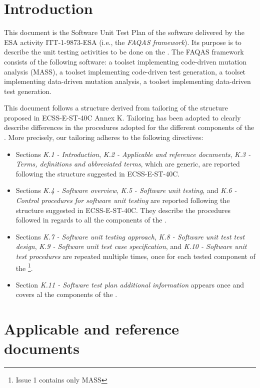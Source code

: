 
\chapter{Introduction}

This document is the Software Unit Test Plan of the software delivered by the ESA activity ITT-1-9873-ESA (i.e., the \emph{FAQAS framework}). Its purpose is to describe the unit testing activities to be done on the \FAQAS.
The FAQAS framework consists of the following software: a toolset  implementing code-driven mutation analysis (MASS), a toolset implementing code-driven test generation, a toolset implementing data-driven mutation analysis, a toolset implementing data-driven test generation.

This document follows a structure derived from tailoring of the structure proposed in ECSS-E-ST-40C Annex K. Tailoring has been adopted to clearly describe differences in the procedures adopted for the different components of the \FAQAS. More precisely, our tailoring adheres to the following directives:

\begin{itemize}
\item Sections
\emph{K.1 - Introduction},
\emph{K.2 - Applicable and reference documents},
\emph{K.3 - Terms, definitions and abbreviated terms}, which are generic, are reported following the structure suggested in ECSS-E-ST-40C.

\item Sections \emph{K.4 - Software overview}, \emph{K.5 - Software unit testing},
 and \emph{K.6 - Control procedures for software unit testing} are reported following the structure suggested in ECSS-E-ST-40C. They describe the procedures followed in regards to all the components of the \FAQAS.

\item Sections \emph{K.7 - Software unit testing approach},
\emph{K.8 - Software unit test test design},
 \emph{K.9 - Software unit test case specification},
 and \emph{K.10 - Software unit test procedures} are repeated multiple times, once for each tested component of the \FAQAS\footnote{Issue 1 contains only MASS}.

\item Section \emph{K.11 - Software test plan additional information} appears once and covers al the components of the \FAQAS.
\end{itemize}

\chapter{Applicable and reference documents}

